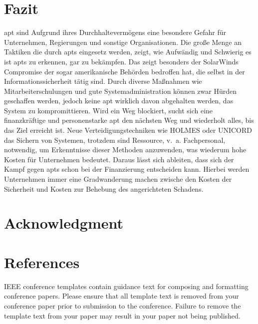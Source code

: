 \documentclass[conference]{IEEEtran}
\begin{document}
\section{Fazit}
\ac{apt} sind Aufgrund ihres Durchhaltevermögens eine besondere Gefahr für Unternehmen, Regierungen und sonstige Organisationen.
Die große Menge an Taktiken die durch \acp{apt} eingesetz werden, zeigt, wie Aufwändig und Schwierig es ist \acp{apt} zu erkennen, gar zu bekämpfen.
Das zeigt besonders der SolarWinds Compromise der sogar amerikanische Behörden bedroffen hat, die selbst in der Informationssicherheit tätig sind.
Durch diverse Maßnahmen wie Mitarbeiterschulungen und gute Systemadministration können zwar Hürden geschaffen werden, jedoch keine \ac{apt} wirklich davon abgehalten werden, das System zu kompromittieren.
Wird ein Weg blockiert, sucht sich eine finanzkräftige und personenstarke \ac{apt} den nächsten Weg und wiederholt alles, bis das Ziel erreicht ist.
Neue Verteidigungstechniken wie HOLMES oder UNICORD das Sichern von Systemen, trotzdem sind Ressource, v.~a. Fachpersonal, notwendig, um Erkenntnisse dieser Methoden anzuwenden, was wiederum hohe Kosten für Unternehmen bedeutet.
Daraus lässt sich ableiten, dass sich der Kampf gegen \acp{apt} schon bei der Finanzierung entscheiden kann.
Hierbei werden Unternehmen immer eine Gradwanderung machen zwische den Kosten der Sicherheit und Kosten zur Behebung des angerichteten Schadens.



\section*{Acknowledgment}

\section*{References}

\balance





\vspace{12pt}
\color{red}
IEEE conference templates contain guidance text for composing and formatting conference papers. Please ensure that all template text is removed from your conference paper prior to submission to the conference. Failure to remove the template text from your paper may result in your paper not being published.
\end{document}
